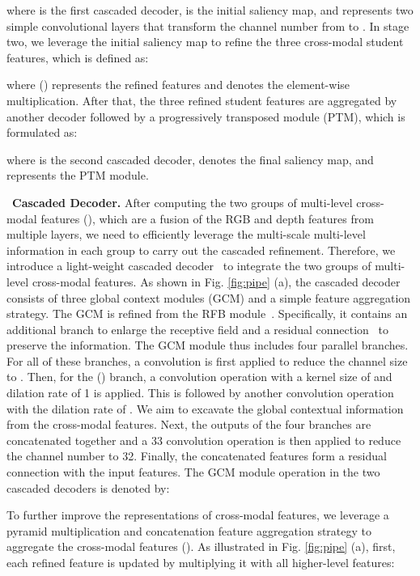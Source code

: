 \documentclass[journal]{IEEEtran}
\newcommand{\figref}[1]{Fig. \ref{#1}}
\newcommand{\myPara}[1]{\vspace{10pt}\noindent~\textbf{#1} \quad}
\begin{document}
where  is the first cascaded decoder,  is the initial saliency map, and  represents two simple convolutional layers that transform the channel number from  to .
In stage two, we leverage the initial saliency map  to refine the three cross-modal student features, which is defined as:

where  () represents the refined features and  denotes the element-wise multiplication.
After that, the three refined student features are aggregated by another decoder followed by a progressively transposed module (PTM), which is formulated as:

where  is the second cascaded decoder,  denotes the final saliency map, and  represents the PTM module. 


\myPara{\textbf{Cascaded Decoder.}}
After computing the two groups of multi-level cross-modal features (), which are a fusion of the RGB and depth features from multiple layers, we need to efficiently leverage the multi-scale multi-level information in each group to carry out the cascaded refinement.
Therefore, we introduce a light-weight cascaded decoder~\cite{Wu2019CPD} to integrate the two groups of multi-level cross-modal features.
As shown in \figref{fig:pipe} (a), the cascaded decoder consists of three global context modules (GCM) and a simple feature aggregation strategy.
The GCM is refined from the RFB module~\cite{liu2018rfb}.
Specifically, it contains an additional branch to enlarge the receptive field and a residual connection~\cite{He2016resnet} to preserve the information.
The GCM module thus includes four parallel branches.
For all of these branches, a  convolution is first applied to reduce the channel size to .
Then, for the  () branch, a convolution operation with a kernel size of  and dilation rate of 1 is applied.
This is followed by another  convolution operation with the dilation rate of .
We aim to excavate the global contextual information from the cross-modal features.
Next, the outputs of the four branches are concatenated together and a 33 convolution operation is then applied to reduce the channel number to 32.
Finally, the concatenated features form a residual connection with the input features.
The GCM module operation in the two cascaded decoders is denoted by:
 
To further improve the representations of cross-modal features,
we leverage a pyramid multiplication and concatenation feature aggregation strategy
to aggregate the cross-modal features ().
As illustrated in \figref{fig:pipe} (a), first, each refined feature  is updated by multiplying it with all higher-level features:
\end{document}
